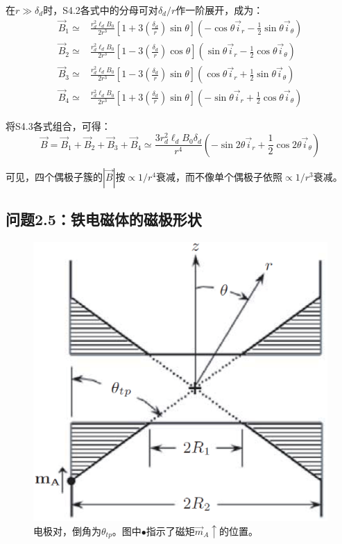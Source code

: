 在$r\gg \delta_d$时，S4.2各式中的分母可对$\delta_d/r$作一阶展开，成为：
\begin{align}
\vec{B}_1 \simeq& \frac{r_d^2 \ell_d B_0}{2 r^3}\left[1+3\left(\frac{\delta_d}{r}\right)\sin\theta \right](-\cos\theta \vec{i}_r-\frac{1}{2}\sin\theta \vec{i}_\theta)\nonumber\tag{S4.3a}\\
\vec{B}_2 \simeq& \frac{r_d^2 \ell_d B_0}{2 r^3}\left[1-3\left(\frac{\delta_d}{r}\right)\cos\theta \right](\sin\theta \vec{i}_r-\frac{1}{2}\cos\theta \vec{i}_\theta)\nonumber\tag{S4.3b}\\
\vec{B}_3 \simeq& \frac{r_d^2 \ell_d B_0}{2 r^3}\left[1-3\left(\frac{\delta_d}{r}\right)\sin\theta \right](\cos\theta \vec{i}_r+\frac{1}{2}\sin\theta \vec{i}_\theta)\nonumber\tag{S4.3c}\\
\vec{B}_4 \simeq& \frac{r_d^2 \ell_d B_0}{2 r^3}\left[1+3\left(\frac{\delta_d}{r}\right)\sin\theta \right](-\sin\theta \vec{i}_r+\frac{1}{2}\cos\theta \vec{i}_\theta)\nonumber\tag{S4.3d}
\end{align}

将S4.3各式组合，可得：
\begin{equation*}
\vec{B}=\vec{B}_1+\vec{B}_2+\vec{B}_3+\vec{B}_4\simeq \frac{3r_d^2 \ell_d B_0 \delta_d}{r^4}(-\sin 2\theta \vec{i}_r+\frac{1}{2}\cos 2\theta \vec{i}_\theta) \tag{2.52}
\end{equation*}

可见，四个偶极子簇的$|\vec{B}|$按$\propto 1/r^4$衰减，而不像单个偶极子依照$\propto 1/r^3$衰减。


\subsection{问题2.5：铁电磁体的磁极形状}

\begin{figure}[htbp]
  \centering
 \includegraphics[scale=0.4]{chpt2/figs/fig2.8.eps}
  \caption{电极对，倒角为$\theta_{tp}$。图中$\bullet$指示了磁矩$\vec{m}_A\uparrow$的位置。}
\end{figure}

